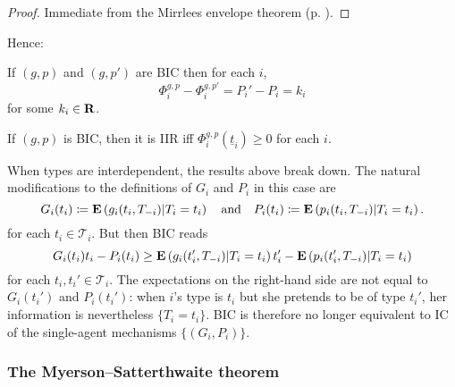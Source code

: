 \documentclass[11pt,letterpaper,reqno,oneside]{article}
\begin{document}
\begin{proof}
	Immediate from the Mirrlees envelope theorem (p. \pageref{theorem:IC_envelope_1d}).
\end{proof}


Hence:
%
\begin{corollary}
	If $(g,p)$ and $(g,p')$ are BIC then for each $i$,
	\begin{equation*}
		\Phi^{g,p}_i - \Phi^{g,p'}_i = P_i' - P_i = k_i
	\end{equation*}
	for some $k_i \in \mathbf{R}$.
\end{corollary}
%
\begin{corollary}
	If $(g,p)$ is BIC, then it is IIR iff $\Phi^{g,p}_i(\underline{t}_i) \geq 0$ for each $i$.
\end{corollary}


When types are interdependent, the results above break down. The natural modifications to the definitions of $G_i$ and $P_i$ in this case are
%
\begin{equation*}
	G_i(t_i) \coloneqq
	\mathbf{E}\left( g_i(t_i,T_{-i}) \middle| T_i=t_i \right)
	\quad\text{and}\quad
	P_i(t_i) \coloneqq
	\mathbf{E}\left( p_i(t_i,T_{-i}) \middle| T_i=t_i \right)  .
\end{equation*}
%
for each $t_i \in \mathcal{T}_i$. But then BIC reads
%
\begin{equation*}
	G_i(t_i) t_i - P_i(t_i)
	\geq \mathbf{E}\left( g_i(t_i',T_{-i}) \middle| T_i=t_i \right) t_i'
	- \mathbf{E}\left( p_i(t_i',T_{-i}) \middle| T_i=t_i \right) 
\end{equation*}
%
for each $t_i,t_i' \in \mathcal{T}_i$. The expectations on the right-hand side are not equal to $G_i(t_i')$ and $P_i(t_i')$: when $i$'s type is $t_i$ but she pretends to be of type $t_i'$, her information is nevertheless $\{ T_i=t_i \}$. BIC is therefore no longer equivalent to IC of the single-agent mechanisms $\{ (G_i,P_i) \}$.




\subsubsection{The Myerson--Satterthwaite theorem}
\label{sec:mech_desi:several_agents_one_dimension:Myerson--Satterthwaite}
\end{document}
